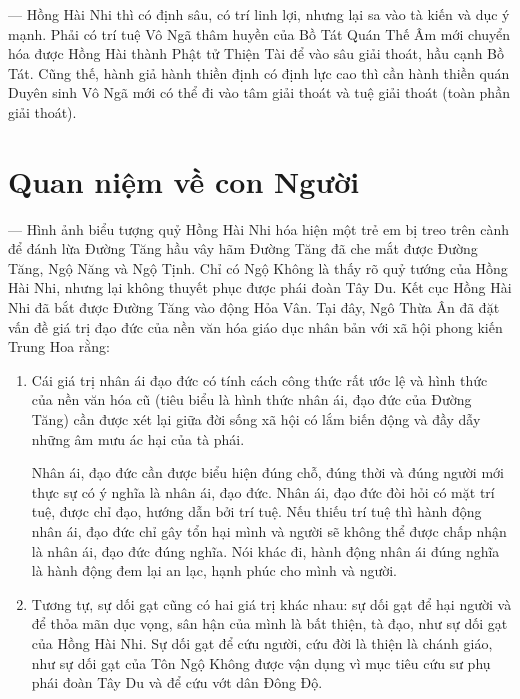 --- Hồng Hài Nhi thì có định sâu, có trí linh lợi, nhưng lại sa vào tà kiến và dục ý mạnh. Phải có trí tuệ Vô Ngã thâm huyền của Bồ Tát Quán Thế Âm mới chuyển hóa được Hồng Hài thành Phật tử Thiện Tài để vào sâu giải thoát, hầu cạnh Bồ Tát. Cũng thế, hành giả hành thiền định có định lực cao thì cần hành thiền quán Duyên sinh Vô Ngã mới có thể đi vào tâm giải thoát và tuệ giải thoát (toàn phần giải thoát).

\section{Quan niệm về con Người} %
\label{sec:40_41_con_nguoi}


--- Hình ảnh biểu tượng quỷ Hồng Hài Nhi hóa hiện một trẻ em bị treo trên cành để đánh lừa Đường Tăng hầu vây hãm Đường Tăng đã che mắt được Đường Tăng, Ngộ Năng và Ngộ Tịnh. Chỉ có Ngộ Không là thấy rõ quỷ tướng của Hồng Hài Nhi, nhưng lại không thuyết phục được phái đoàn Tây Du. Kết cục Hồng Hài Nhi đã bắt được Đường Tăng vào động Hỏa Vân. Tại đây, Ngô Thừa Ân đã đặt vấn đề giá trị đạo đức của nền văn hóa giáo dục nhân bản với xã hội phong kiến Trung Hoa rằng:

\begin{enumerate}[label=\itshape\arabic*\upshape/]
   \item Cái giá trị nhân ái đạo đức có tính cách công thức rất ước lệ và hình thức của nền văn hóa cũ (tiêu biểu là hình thức nhân ái, đạo đức của Đường Tăng) cần được xét lại giữa đời sống xã hội có lắm biến động và đầy dẫy những âm mưu ác hại của tà phái.

   Nhân ái, đạo đức cần được biểu hiện đúng chỗ, đúng thời và đúng người mới thực sự có ý nghĩa là nhân ái, đạo đức. Nhân ái, đạo đức đòi hỏi có mặt trí tuệ, được chỉ đạo, hướng dẫn bởi trí tuệ. Nếu thiếu trí tuệ thì hành động nhân ái, đạo đức chỉ gây tổn hại mình và người sẽ không thể được chấp nhận là nhân ái, đạo đức đúng nghĩa. Nói khác đi, hành động nhân ái đúng nghĩa là hành động đem lại an lạc, hạnh phúc cho mình và người.

    \item Tương tự, sự dối gạt cũng có hai giá trị khác nhau: sự dối gạt để hại người và để thỏa mãn dục vọng, sân hận của mình là bất thiện, tà đạo, như sự dối gạt của Hồng Hài Nhi. Sự dối gạt để cứu người, cứu đời là thiện là chánh giáo, như sự dối gạt của Tôn Ngộ Không được vận dụng vì mục tiêu cứu sư phụ phái đoàn Tây Du và để cứu vớt dân Đông Độ.
\end{enumerate}


